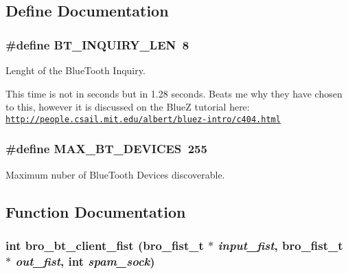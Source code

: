 \subsection{Define Documentation}
\hypertarget{group___bro_b_t_ga71ecc1aec5ed97ddbc4a321750a93a92}{
\subsubsection[{BT\_\-INQUIRY\_\-LEN}]{\setlength{\rightskip}{0pt plus 5cm}\#define BT\_\-INQUIRY\_\-LEN~8}}
\label{group___bro_b_t_ga71ecc1aec5ed97ddbc4a321750a93a92}


Lenght of the BlueTooth Inquiry. 

This time is not in seconds but in 1.28 seconds. Beats me why they have chosen to this, however it is discussed on the BlueZ tutorial here: \href{http://people.csail.mit.edu/albert/bluez-intro/c404.html}{\tt http://people.csail.mit.edu/albert/bluez-\/intro/c404.html} \hypertarget{group___bro_b_t_gad8d503dc1b9bb10e606ac09669305612}{
\subsubsection[{MAX\_\-BT\_\-DEVICES}]{\setlength{\rightskip}{0pt plus 5cm}\#define MAX\_\-BT\_\-DEVICES~255}}
\label{group___bro_b_t_gad8d503dc1b9bb10e606ac09669305612}


Maximum nuber of BlueTooth Devices discoverable. 



\subsection{Function Documentation}
\hypertarget{group___bro_b_t_gafe494b1180377249a86e62f44a95638b}{
\subsubsection[{bro\_\-bt\_\-client\_\-fist}]{\setlength{\rightskip}{0pt plus 5cm}int bro\_\-bt\_\-client\_\-fist ({\bf bro\_\-fist\_\-t} $\ast$ {\em input\_\-fist}, \/  {\bf bro\_\-fist\_\-t} $\ast$ {\em out\_\-fist}, \/  int {\em spam\_\-sock})}}
\label{group___bro_b_t_gafe494b1180377249a86e62f44a95638b}


